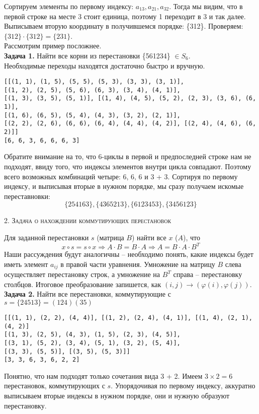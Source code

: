 \documentclass[a4paper,12pt]{article}
\begin{document}
Сортируем элементы по первому индексу: $a_{13}, a_{21}, a_{32}.$ Тогда мы видим, что в первой строке на месте 3 стоит единица, поэтому 1 переходит в 3 и так далее. Выписываем вторую координату в получившемся порядке: \{312\}. Проверяем: $\{312\} \cdot \{312\} = \{231\}$. \\
Рассмотрим пример посложнее. \\
\textbf{Задача 1.} Найти все корни из перестановки \{561234\} $\in S_6$. \\
Необходимые переходы находятся достаточно быстро и вручную. 
\begin{lstlisting}
[[(1, 1), (1, 5), (5, 5), (5, 3), (3, 3), (3, 1)], 
[(1, 2), (2, 5), (5, 6), (6, 3), (3, 4), (4, 1)],
[(1, 3), (3, 5), (5, 1)], [(1, 4), (4, 5), (5, 2), (2, 3), (3, 6), (6, 1)],
[(1, 6), (6, 5), (5, 4), (4, 3), (3, 2), (2, 1)],
[(2, 2), (2, 6), (6, 6), (6, 4), (4, 4), (4, 2)], [(2, 4), (4, 6), (6, 2)]]
[6, 6, 3, 6, 6, 6, 3]
\end{lstlisting}
Обратите внимание на то, что 6-циклы в первой и предпоследней строке нам не подходят, ввиду того, что индексы элементов внутри цикла совпадают. Поэтому всего возможных комбинаций четыре: 6, 6, 6 и 3 + 3. 
Сортируя по первому индексу, и выписывая вторые в нужном порядке, мы сразу получаем искомые переставновки:
\[\{254163\}, \{4365213\}, \{6123453\}, \{3456123\}\]
\begin{center}
    \textsc{2. Задача о нахождении коммутирующих перестановок}
\end{center}
Для заданной перестановки $s$ (матрица $B$) найти все $x$ ($A$), что
\[ x \circ s = s \circ x \Rightarrow A \cdot B = B \cdot A \Rightarrow A = B \cdot A \cdot B^T\]
Наши рассуждения будут аналогичны -- необходимо понять, какие индексы будет иметь элемент $a_{ij}$ в правой части уравнения. Умножение на матрицу $B$ слева осуществляет перестановку строк, а умножение на $B^T$ справа -- перестановку столбцов. Итоговое преобразование запишется, как $(i, j) \longrightarrow (\varphi(i), \varphi(j))$. \\
\textbf{Задача 2.} Найти все перестановки, коммутирующие с $s = \{24513\} = (124)(35)$
\begin{lstlisting}
[[(1, 1), (2, 2), (4, 4)], [(1, 2), (2, 4), (4, 1)], [(1, 4), (2, 1), (4, 2)]
[(1, 3), (2, 5), (4, 3), (1, 5), (2, 3), (4, 5)],
[(3, 1), (5, 2), (3, 4), (5, 1), (3, 2), (5, 4)], 
[(3, 3), (5, 5)], [(3, 5), (5, 3)]]
[3, 3, 6, 3, 6, 2, 2]
\end{lstlisting}
Понятно, что нам подходят только сочетания вида 3 + 2. Имеем $3 \times 2 = 6$ перестановок, коммутирующих с $s$. Упорядочивая по первому индексу, аккуратно выписываем вторые индексы в нужном порядке, они и нужную образуют перестановку. 
\end{document}
